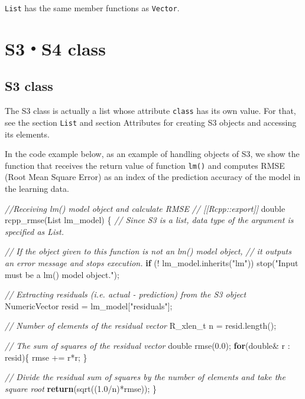 \documentclass[]{book}
\newenvironment{Shaded}{\begin{snugshade}}{\end{snugshade}}
\newcommand{\CommentTok}[1]{\textcolor[rgb]{0.56,0.35,0.01}{\textit{#1}}}
\newcommand{\ControlFlowTok}[1]{\textcolor[rgb]{0.13,0.29,0.53}{\textbf{#1}}}
\newcommand{\DataTypeTok}[1]{\textcolor[rgb]{0.13,0.29,0.53}{#1}}
\newcommand{\FloatTok}[1]{\textcolor[rgb]{0.00,0.00,0.81}{#1}}
\newcommand{\NormalTok}[1]{#1}
\newcommand{\StringTok}[1]{\textcolor[rgb]{0.31,0.60,0.02}{#1}}
\begin{document}
\texttt{List} has the same member functions as \texttt{Vector}.

\hypertarget{s3s4-class}{%
\chapter{S3・S4 class}\label{s3s4-class}}

\hypertarget{s3-class}{%
\section{S3 class}\label{s3-class}}

The S3 class is actually a list whose attribute \texttt{class} has its own value. For that, see the section \texttt{List} and section Attributes for creating S3 objects and accessing its elements.

In the code example below, as an example of handling objects of S3, we show the function that receives the return value of function \texttt{lm()} and computes RMSE (Root Mean Square Error) as an index of the prediction accuracy of the model in the learning data.

\begin{Shaded}
\begin{Highlighting}[]
\CommentTok{//Receiving lm() model object and calculate RMSE}
\CommentTok{// [[Rcpp::export]]}
\DataTypeTok{double}\NormalTok{ rcpp_rmse(List lm_model) \{}
    \CommentTok{// Since S3 is a list, data type of the argument is specified as List.}

    \CommentTok{// If the object given to this function is not an lm() model object,}
    \CommentTok{// it outputs an error message and stops execution.}
    \ControlFlowTok{if}\NormalTok{ (! lm_model.inherits(}\StringTok{"lm"}\NormalTok{)) stop(}\StringTok{"Input must be a lm() model object."}\NormalTok{);}

    \CommentTok{// Extracting residuals (i.e. actual - prediction) from the S3 object}
\NormalTok{    NumericVector resid  = lm_model[}\StringTok{"residuals"}\NormalTok{];}

    \CommentTok{// Number of elements of the residual vector}
    \DataTypeTok{R_xlen_t}\NormalTok{ n = resid.length();}

    \CommentTok{// The sum of squares of the residual vector}
    \DataTypeTok{double}\NormalTok{ rmse(}\FloatTok{0.0}\NormalTok{);}
    \ControlFlowTok{for}\NormalTok{(}\DataTypeTok{double}\NormalTok{& r : resid)\{}
\NormalTok{        rmse += r*r;}
\NormalTok{    \}}

    \CommentTok{// Divide the residual sum of squares by the number of elements and take the square root}
    \ControlFlowTok{return}\NormalTok{(sqrt((}\FloatTok{1.0}\NormalTok{/n)*rmse));}
\NormalTok{\}}
\end{Highlighting}
\end{Shaded}
\end{document}

